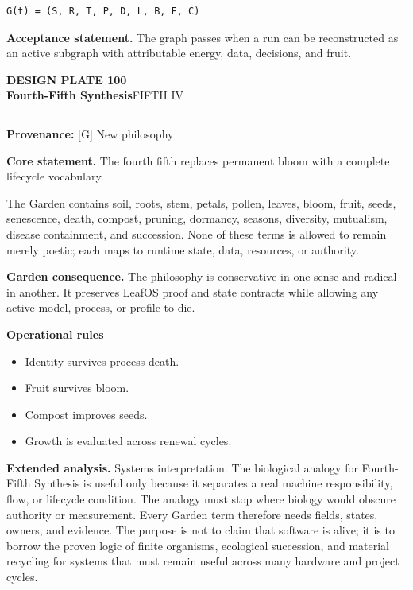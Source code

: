 \documentclass[10pt,letterpaper,oneside]{article}
\newcommand{\prov}[1]{\textcolor{gardenBlue}{\sffamily\footnotesize\textbf{Provenance:} #1}}
\newcommand{\platetitle}[3]{%
  \begin{minipage}[t][0.54in][t]{\textwidth}
  {\sffamily\bfseries\color{gardenDeep}\fontsize{9}{10}\selectfont DESIGN PLATE #1}\\[-1pt]
  {\sffamily\bfseries\color{gardenInk}\fontsize{16.5}{18}\selectfont #2}\hfill{\sffamily\color{gardenGreen}\large #3}
  \end{minipage}\vspace{-2pt}\hrule\vspace{5pt}}
\begin{document}
\begin{lstlisting}
G(t) = (S, R, T, P, D, L, B, F, C)
\end{lstlisting}
\begin{acceptbox}
\textbf{Acceptance statement.} The graph passes when a run can be reconstructed as an active subgraph with attributable energy, data, decisions, and fruit.
\end{acceptbox}
\newpage
\platetitle{100}{Fourth-Fifth Synthesis}{FIFTH IV}
\prov{[G] New philosophy}
\fontsize{8.85}{10.45}\selectfont
\begin{corebox}
\textbf{Core statement.} The fourth fifth replaces permanent bloom with a complete lifecycle vocabulary.
\end{corebox}
The Garden contains soil, roots, stem, petals, pollen, leaves, bloom, fruit, seeds, senescence, death, compost, pruning, dormancy, seasons, diversity, mutualism, disease containment, and succession. None of these terms is allowed to remain merely poetic; each maps to runtime state, data, resources, or authority.

\textbf{Garden consequence.} The philosophy is conservative in one sense and radical in another. It preserves LeafOS proof and state contracts while allowing any active model, process, or profile to die.

\textbf{Operational rules}
\begin{itemize}
\item Identity survives process death.
\item Fruit survives bloom.
\item Compost improves seeds.
\item Growth is evaluated across renewal cycles.
\end{itemize}
\textbf{Extended analysis.} Systems interpretation. The biological analogy for Fourth-Fifth Synthesis is useful only because it separates a real machine responsibility, flow, or lifecycle condition. The analogy must stop where biology would obscure authority or measurement. Every Garden term therefore needs fields, states, owners, and evidence. The purpose is not to claim that software is alive; it is to borrow the proven logic of finite organisms, ecological succession, and material recycling for systems that must remain useful across many hardware and project cycles.
\end{document}
